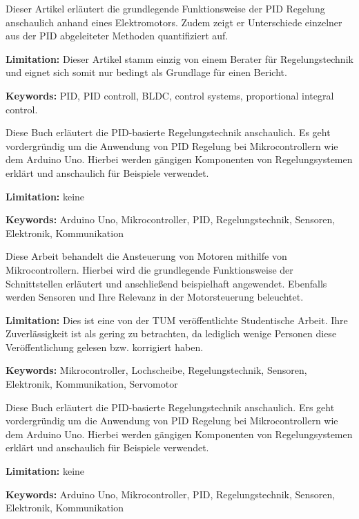 { 
	
	Dieser Artikel \cite{Wescott:2018}	erläutert die grundlegende Funktionsweise der PID Regelung anschaulich anhand eines Elektromotors. Zudem zeigt er Unterschiede einzelner aus der PID abgeleiteter Methoden quantifiziert auf. 
	\bigskip
	
	\textbf{Limitation:} Dieser Artikel stamm einzig von einem Berater für Regelungstechnik und eignet sich somit nur bedingt als Grundlage für einen Bericht. 
	
	\scriptsize{\textbf{Keywords:} PID, PID controll, BLDC, control systems, proportional integral control. }
}



{ 
	Diese Buch  \cite{Ibrahim:2023} erläutert die PID-basierte Regelungstechnik anschaulich. Es geht vordergründig um die Anwendung von PID Regelung bei Mikrocontrollern wie dem Arduino Uno. Hierbei werden gängigen Komponenten von Regelungsystemen erklärt und anschaulich für Beispiele verwendet. 
	
	\bigskip
	
	\textbf{Limitation:} keine 
	
	\scriptsize{\textbf{Keywords:} Arduino Uno, Mikrocontroller, PID, Regelungstechnik, Sensoren, Elektronik, Kommunikation }
}

{ 
	Diese Arbeit  \cite{Niemeyer:2015} behandelt die Ansteuerung von Motoren mithilfe von Mikrocontrollern. Hierbei wird die grundlegende Funktionsweise der Schnittstellen erläutert und anschließend beispielhaft angewendet. Ebenfalls werden Sensoren und Ihre Relevanz in der Motorsteuerung beleuchtet. 
	
	\textbf{Limitation:} Dies ist eine von der TUM veröffentlichte Studentische Arbeit. Ihre Zuverlässigkeit ist als gering zu betrachten, da lediglich wenige Personen diese Veröffentlichung gelesen bzw. korrigiert haben. 
	
	\scriptsize{\textbf{Keywords:}  Mikrocontroller, Lochscheibe, Regelungstechnik, Sensoren, Elektronik, Kommunikation, Servomotor }
}
{ 
	Diese Buch  \cite{Ibrahim:2023} erläutert die PID-basierte Regelungstechnik anschaulich. Ers geht vordergründig um die Anwendung von PID Regelung bei Mikrocontrollern wie dem Arduino Uno. Hierbei werden gängigen Komponenten von Regelungsystemen erklärt und anschaulich für Beispiele verwendet. 
	
	\bigskip
	
	\textbf{Limitation:} keine 
	
	\scriptsize{\textbf{Keywords:} Arduino Uno, Mikrocontroller, PID, Regelungstechnik, Sensoren, Elektronik, Kommunikation }
} 


